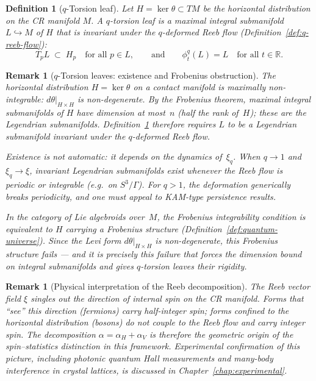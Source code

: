 \documentclass[12pt,a4paper]{report}
\newtheorem{definition}[theorem]{Definition}
\newtheorem{remark}[theorem]{Remark}
\begin{document}
\begin{definition}[$q$-Torsion leaf]
\label{def:q-torsion-leaf}
Let $H = \ker\theta \subset TM$ be the horizontal distribution on the
CR manifold $M$.  A \emph{$q$-torsion leaf} is a maximal integral
submanifold $L \hookrightarrow M$ of $H$ that is invariant under the
$q$-deformed Reeb flow (Definition~\ref{def:q-reeb-flow}):
\[
  T_p L \;\subset\; H_p
  \quad\text{for all } p \in L,
  \qquad\text{and}\qquad
  \phi_t^q(L) = L
  \quad\text{for all } t \in \mathbb{R}.
\]
\end{definition}

\begin{remark}[$q$-Torsion leaves: existence and Frobenius obstruction]
\label{rem:q-torsion-existence}
The horizontal distribution $H = \ker\theta$ on a contact manifold is
maximally non-integrable: $d\theta|_{H \times H}$ is non-degenerate.
By the Frobenius theorem, maximal integral submanifolds of $H$ have
dimension at most~$n$ (half the rank of~$H$); these are the
\emph{Legendrian submanifolds}.  Definition~\ref{def:q-torsion-leaf}
therefore requires $L$ to be a Legendrian submanifold invariant under the
$q$-deformed Reeb flow.

Existence is not automatic: it depends on the dynamics of~$\xi_q$.
When $q \to 1$ and $\xi_q \to \xi$, invariant Legendrian submanifolds
exist whenever the Reeb flow is periodic or integrable (e.g.\ on
$S^3/\Gamma$).  For $q > 1$, the deformation generically breaks
periodicity, and one must appeal to KAM-type persistence results.

In the category of Lie algebroids over~$M$, the Frobenius integrability
condition is equivalent to $H$ carrying a Frobenius structure
(Definition~\ref{def:quantum-universe}).  Since the Levi form
$d\theta|_{H \times H}$ is non-degenerate, this Frobenius structure
\emph{fails} --- and it is precisely this failure that forces the
dimension bound on integral submanifolds and gives $q$-torsion leaves
their rigidity.
\end{remark}

\begin{remark}[Physical interpretation of the Reeb decomposition]
\label{rem:reeb-physical}
The Reeb vector field $\xi$ singles out the direction of internal spin on the
CR manifold.  Forms that ``see'' this direction (fermions) carry half-integer
spin; forms confined to the horizontal distribution (bosons) do not couple to
the Reeb flow and carry integer spin.  The decomposition
$\alpha = \alpha_H + \alpha_V$ is therefore the geometric origin of the
spin--statistics distinction in this framework.  Experimental confirmation of
this picture, including photonic quantum Hall measurements and many-body
interference in crystal lattices, is discussed in
Chapter~\ref{chap:experimental}.
\end{remark}
\end{document}
